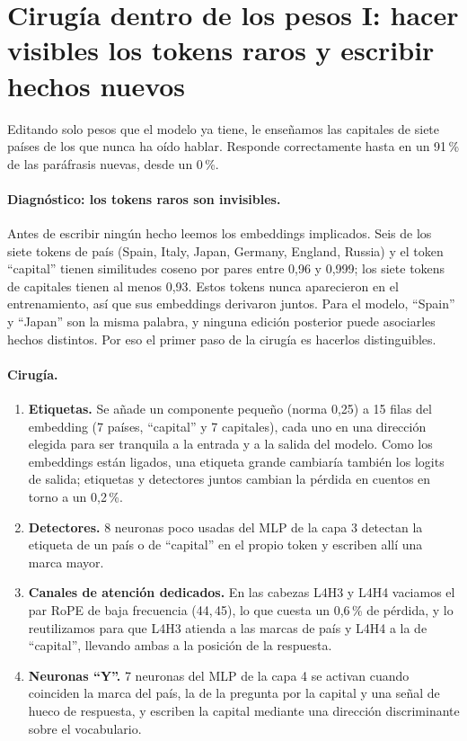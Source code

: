 \documentclass[11pt]{article}
\begin{document}
\section{Cirugía dentro de los pesos I: hacer visibles los tokens raros y escribir hechos nuevos}\label{sec:facts}
Editando solo pesos que el modelo ya tiene, le enseñamos las capitales de siete países de los que nunca ha oído hablar. Responde correctamente hasta en un 91\,\% de las paráfrasis nuevas, desde un 0\,\%.

\paragraph{Diagnóstico: los tokens raros son invisibles.} Antes de escribir ningún hecho leemos los embeddings implicados. Seis de los siete tokens de país (Spain, Italy, Japan, Germany, England, Russia) y el token ``capital'' tienen similitudes coseno por pares entre 0,96 y 0,999; los siete tokens de capitales tienen al menos 0,93. Estos tokens nunca aparecieron en el entrenamiento, así que sus embeddings derivaron juntos. Para el modelo, ``Spain'' y ``Japan'' son la misma palabra, y ninguna edición posterior puede asociarles hechos distintos. Por eso el primer paso de la cirugía es hacerlos distinguibles.

\paragraph{Cirugía.}
\begin{enumerate}[leftmargin=*]
\item \textbf{Etiquetas.} Se añade un componente pequeño (norma 0,25) a 15 filas del embedding (7 países, ``capital'' y 7 capitales), cada uno en una dirección elegida para ser tranquila a la entrada y a la salida del modelo. Como los embeddings están ligados, una etiqueta grande cambiaría también los logits de salida; etiquetas y detectores juntos cambian la pérdida en cuentos en torno a un 0,2\,\%.
\item \textbf{Detectores.} 8 neuronas poco usadas del MLP de la capa 3 detectan la etiqueta de un país o de ``capital'' en el propio token y escriben allí una marca mayor.
\item \textbf{Canales de atención dedicados.} En las cabezas L4H3 y L4H4 vaciamos el par RoPE de baja frecuencia (44,\,45), lo que cuesta un 0,6\,\% de pérdida, y lo reutilizamos para que L4H3 atienda a las marcas de país y L4H4 a la de ``capital'', llevando ambas a la posición de la respuesta.
\item \textbf{Neuronas ``Y''.} 7 neuronas del MLP de la capa 4 se activan cuando coinciden la marca del país, la de la pregunta por la capital y una señal de hueco de respuesta, y escriben la capital mediante una dirección discriminante sobre el vocabulario.
\end{enumerate}
\end{document}
